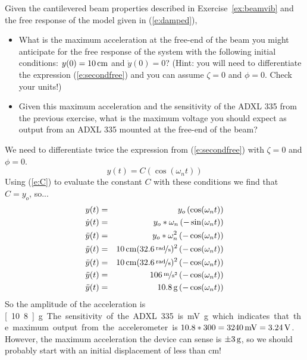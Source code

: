 \begin{ex}
Given the cantilevered beam properties described in Exercise~\ref{ex:beamvib} and the free response of the model given in (\ref{e:damped}),
\begin{itemize}
\item What is the maximum acceleration at the free-end of the beam  you might anticipate for the free response of the system with the following initial conditions: $y(0)=\unit[10]{cm}$ and $\dot{y}(0)=0$? (Hint: you will need to differentiate the expression (\ref{e:secondfree}) and you can assume $\zeta=0$ and $\phi=0$. Check your units!)
\item Given this maximum acceleration and the sensitivity of the ADXL 335 from the previous exercise, what is the maximum voltage you should expect as output from an ADXL 335 mounted at the free-end of the beam?
\end{itemize}
\end{ex}

\ifsolutions
\begin{soln}
We need to differentiate twice the expression from (\ref{e:secondfree}) with $\zeta=0$ and $\phi=0$.  
\[
y(t) = C \left( \cos(\omega_n t ) \right)
\]
Using (\ref{e:C}) to evaluate the constant $C$ with these conditions we find that $C=y_o$, so...
\begin{eqnarray}
y(t) & = & y_o \left( \cos(\omega_n t ) \right) \\
\dot{y}(t) & = & y_o * \omega_n \left(-\sin(\omega_n t ) \right) \\
\ddot{y}(t) & = & y_o * \omega_n^2 \left( -\cos(\omega_n t ) \right) \\
\ddot{y}(t) & = & \unit[10]{cm} (\unitfrac[32.6]{rad}{s})^2 \left( -\cos(\omega_n t ) \right) \\
\ddot{y}(t) & = & \unit[10]{cm} (\unitfrac[32.6]{rad}{s})^2 \left( -\cos(\omega_n t ) \right) \\
\ddot{y}(t) & = & \unitfrac[106]{m}{s^2} \left( -\cos(\omega_n t ) \right) \\
\ddot{y}(t) & = & \unit[10.8]{g} \left( -\cos(\omega_n t ) \right) 
\end{eqnarray}
So the amplitude of the acceleration is \unit[10.8]{g}.  The sensitivity of the ADXL 335 is \unit[300]{mV}{g} which indicates that the maximum output from the accelerometer is $10.8*300 = \unit[3240]{mV} = \unit[3.24]{V}$. However, the maximum acceleration the device can sense is $\pm\unit[3]{g}$, so we should probably start with an initial displacement of less than \unit[10]{cm}!
\end{soln}
\fi


